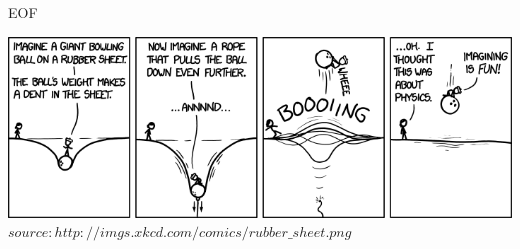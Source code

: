 		
	\begin{frame} {EOF}
		\begin{center}
			\includegraphics[scale=0.45]{graphics/eof11.png}\\
			\tiny $source: http://imgs.xkcd.com/comics/rubber\_sheet.png$
		\end{center}
	\end{frame}


